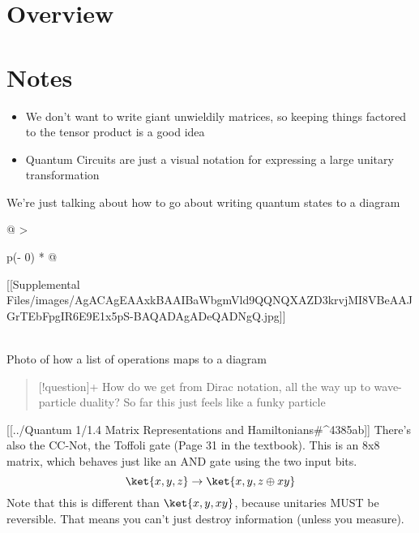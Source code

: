 \documentclass[]{article}
\providecommand{\tightlist}{%
  \setlength{\itemsep}{0pt}\setlength{\parskip}{0pt}}
\begin{document}
\hypertarget{overview}{%
\section{Overview}\label{overview}}

\hypertarget{notes}{%
\section{Notes}\label{notes}}

\begin{itemize}
\tightlist
\item
  We don't want to write giant unwieldily matrices, so keeping things
  factored to the tensor product is a good idea
\item
  Quantum Circuits are just a visual notation for expressing a large
  unitary transformation
\end{itemize}

We're just talking about how to go about writing quantum states to a
diagram

\begin{longtable}[]{@{}
  >{\raggedright\arraybackslash}p{(\columnwidth - 0\tabcolsep) * }@{}}
\toprule\noalign{}
\begin{minipage}[b]{\linewidth}\raggedright
{[}{[}Supplemental
Files/images/AgACAgEAAxkBAAIBaWbgmVld9QQNQXAZD3krvjMI8VBeAAJGrTEbFpgIR6E9E1x5pS-BAQADAgADeQADNgQ.jpg{]}{]}
\end{minipage} \\
\midrule\noalign{}
\endhead
\bottomrule\noalign{}
\endlastfoot
Photo of how a list of operations maps to a diagram \\
\end{longtable}

\begin{quote}
{[}!question{]}+ How do we get from Dirac notation, all the way up to
wave-particle duality? So far this just feels like a funky particle
\end{quote}

{[}{[}../Quantum 1/1.4 Matrix Representations and
Hamiltonians\#\^{}4385ab{]}{]} There's also the CC-Not, the Toffoli gate
(Page 31 in the textbook). This is an 8x8 matrix, which behaves just
like an AND gate using the two input bits. \[
\ket{x,y,z} \to \ket{x,y,z\oplus xy} 
\] Note that this is different than \(\ket{x,y,xy}\), because unitaries
MUST be reversible. That means you can't just destroy information
(unless you measure).
\end{document}
